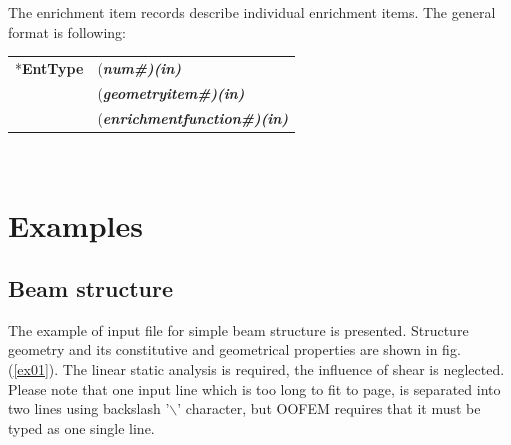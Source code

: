 \documentclass[a4paper]{article}
\makeatletter
\newcommand{\fieldVal}[2]{\mbox{({\it\bf{#1}\#)\tiny (#2)}}}
\newcommand{\entKeyword}[1]{\mbox{{*{\bf{#1}}}}}
\newenvironment{record}[1][]{\begin{tabular}{|ll}}{\end{tabular}\\}
\newcommand{\recentry}[2]{{#1}&{#2}\\}
\newcounter{rcc}
\newenvironment{record}[1][\textwidth]{\setcounter{rcc}{0}\begin{tabular*}{#1}{|ll@{\extracolsep{\fill}}r}}{\end{tabular*}\\}
\newcommand{\recentry}[2]{\ifthenelse{\value{rcc}>0}{&$\backslash$ \\}{\setcounter{rcc}{1}}{#1}&{#2}}
\makeatother
\begin{document}
The enrichment item records describe individual enrichment items. The general format is following:\\
\noindent
\begin{record}
  \recentry{\entKeyword{EntType}}{\fieldVal{num}{in}} \recentry{}{\fieldVal{geometryitem}{in}} \recentry{}{\fieldVal{enrichmentfunction}{in}}
\end{record}


\section{Examples}
\subsection {Beam structure}
The example of input file for simple beam structure is presented.
Structure geometry and its constitutive and geometrical properties are
shown in fig. (\ref{ex01}). The linear static analysis is required,
the influence of shear is neglected. Please note that one input line
which is too long to fit to page, is separated into two lines using
backslash '$\backslash$' character, but OOFEM requires that it must be typed as one single line.
\end{document}
